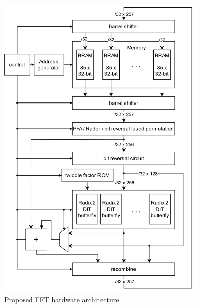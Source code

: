 \documentclass[english,master=eelt,masteroption=ec]{kulemt}
\begin{document}
\begin{figure}[h]
\centering
\includegraphics[width=0.9\textwidth]{img/architecture.png}
\caption{Proposed FFT hardware architecture}
\label{fig:hardware_overview}
\end{figure}

\FloatBarrier
\end{document}
